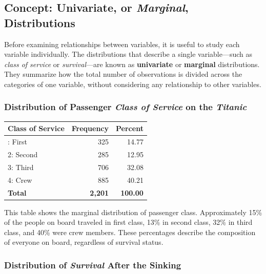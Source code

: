 \documentclass[
  letterpaper,
  DIV=11,
  numbers=noendperiod]{scrreprt}
\begin{document}
\subsection{\texorpdfstring{Concept: Univariate, or \emph{Marginal},
Distributions}{Concept: Univariate, or Marginal, Distributions}}\label{concept-univariate-or-marginal-distributions}

Before examining relationships between variables, it is useful to study
each variable individually. The distributions that describe a single
variable---such as \emph{class of service} or \emph{survival}---are
known as \textbf{univariate} or \textbf{marginal} distributions. They
summarize how the total number of observations is divided across the
categories of one variable, without considering any relationship to
other variables.

\subsubsection{\texorpdfstring{Distribution of Passenger \emph{Class of
Service} on the
\emph{Titanic}}{Distribution of Passenger Class of Service on the Titanic}}\label{distribution-of-passenger-class-of-service-on-the-titanic}

\begin{longtable}[]{@{}lrr@{}}
\toprule\noalign{}
\textbf{Class of Service} & \textbf{Frequency} & \textbf{Percent} \\
\midrule\noalign{}
\endhead
\bottomrule\noalign{}
\endlastfoot
1: First & 325 & 14.77 \\
2: Second & 285 & 12.95 \\
3: Third & 706 & 32.08 \\
4: Crew & 885 & 40.21 \\
\textbf{Total} & \textbf{2,201} & \textbf{100.00} \\
\end{longtable}

This table shows the marginal distribution of passenger class.
Approximately 15\% of the people on board traveled in first class, 13\%
in second class, 32\% in third class, and 40\% were crew members. These
percentages describe the composition of everyone on board, regardless of
survival status.

\subsubsection{\texorpdfstring{Distribution of \emph{Survival} After the
Sinking}{Distribution of Survival After the Sinking}}\label{distribution-of-survival-after-the-sinking}
\end{document}
